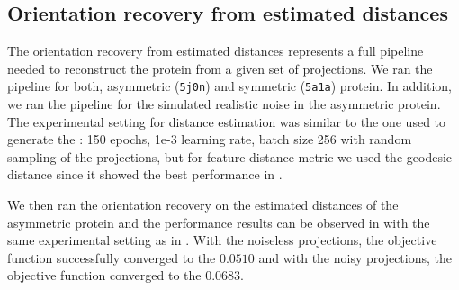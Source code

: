 
\subsection{Orientation recovery from estimated distances}


The orientation recovery from estimated distances represents a full pipeline needed to reconstruct the protein from a given set of projections.
We ran the pipeline for both, asymmetric (\texttt{5j0n}) and symmetric (\texttt{5a1a}) protein.
In addition, we ran the pipeline for the simulated realistic noise in the asymmetric protein.
The experimental setting for distance estimation was similar to the one used to generate the : 150 epochs, 1e-3 learning rate, batch size 256 with random sampling of the projections, but for feature distance metric we used the geodesic distance since it showed the best performance in .

We then ran the orientation recovery on the estimated distances of the asymmetric protein and the performance results can be observed in  with the same experimental setting as in .
With the noiseless projections, the objective function successfully converged to the $0.0510$ and with the noisy projections, the objective function converged to the $0.0683$.

